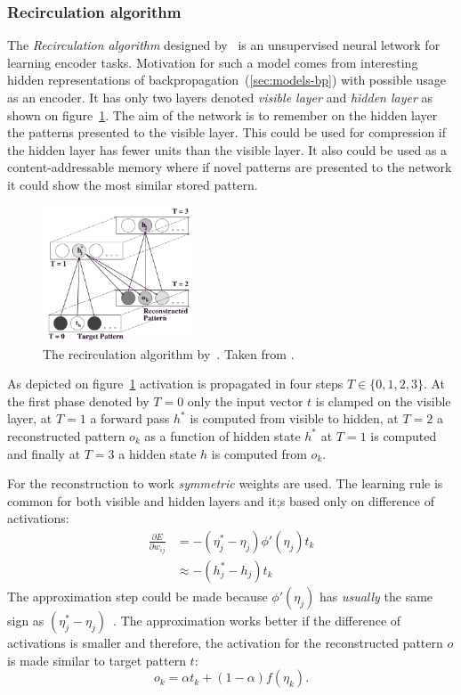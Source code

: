 \subsubsection{Recirculation algorithm}
\label{sec:models-recirc} 

The \emph{Recirculation algorithm} designed by~\citet{hinton1988learning} is an unsupervised neural letwork for learning encoder tasks. Motivation for such a model comes from interesting hidden representations of backpropagation~(\ref{sec:models-bp}) with possible usage as an encoder. It has only two layers denoted \emph{visible layer} and \emph{hidden layer} as shown on figure~\ref{fig:models-recirc}. The aim of the network is to remember on the hidden layer the patterns presented to the visible layer. This could be used for compression if the hidden layer has fewer units than the visible layer. It also could be used as a content-addressable memory where if novel patterns are presented to the network it could show the most similar stored pattern. 

\begin{figure}[H]
  \centering
\includegraphics[width=0.4\textwidth]{img/recirculation.png}
  \caption{The recirculation algorithm by~\citet{hinton1988learning}. Taken from \citep{o1996bio}.}
  \label{fig:models-recirc}
\end{figure}

As depicted on figure~\ref{fig:models-recirc} activation is propagated in four steps $T \in \{0,1,2,3\}$. At the first phase denoted by $T=0$ only the input vector $t$ is clamped on the visible layer, at $T=1$ a forward pass $h^{*}$ is computed from visible to hidden, at $T=2$ a reconstructed pattern $o_k$ as a function of hidden state $h^{*}$ at $T=1$ is computed and finally at $T=3$ a hidden state $h$ is computed from $o_k$.

For the reconstruction to work \emph{symmetric} weights are used. The learning rule is common for both visible and hidden layers and it;s based only on difference of activations: 
\begin{align}
\frac{\partial E}{\partial w_{ij}} &= -(\eta^{*}_j - \eta_j) \phi'(\eta_j) t_k \nonumber \\
&\approx -(h^{*}_j - h_j)t_k \nonumber 
\end{align} 
The approximation step could be made because $\phi'(\eta_j)$ has \emph{usually} the same sign as $(\eta^{*}_j - \eta_j) $~\citep{hinton1988learning, o1996bio}. The approximation works better if the difference of activations is smaller and therefore, the activation for the reconstructed pattern $o$  is made similar to target pattern $t$: 
\begin{equation}
o_k = \alpha t_k + (1-\alpha)f(\eta_k). 
\end{equation} 

